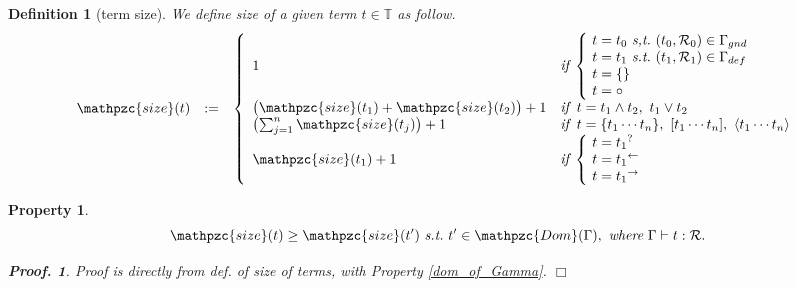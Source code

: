 \documentclass[12pt]{article}
\newtheorem{Definition}{Definition}[section]
\newtheorem{Property}{Property}[section]
\newtheorem{Proof}{Proof.}
\begin{document}
\begin{Definition}[term size]
  We define size of a given term $t \in \mathbb{T}$ as follow.
  \begin{displaymath}
    \begin{array}{lll}
      \mathpzc{size}(t) &:=
      & \left\{ \begin{array}{ll}
          1  & \text{\it if}\;
                \left\{ \! \begin{array}{l}
                  t = t_0\ \text{\it s,t.}\
                   (t_0, \mathcal{R}_0) \in \Gamma_{gnd}  \\
                  t = t_1\ \text{\it s.t.}\
                   (t_1, \mathcal{R}_1) \in \Gamma_{def}  \\
                  t = \{\}  \\
                  t = \circ
                \end{array} \right.  \\
          \bigl(\mathpzc{size}(t_1) + \mathpzc{size}(t_2) \bigr) + 1  &
           \text{\it if}\;\; t = t_1 \wedge t_2,\ t_1 \vee t_2  \\
          \bigl(\sum_{j=1}^{n} \mathpzc{size}(t_j) \bigr) + 1  &
           \text{\it if}\;\; t = \{t_1 \cdots t_n \},
            \ [t_1 \cdots t_n ], \ \langle t_1 \cdots t_n \rangle  \\
          \mathpzc{size}(t_1) + 1  &
           \text{\it if}\; \left\{ \! \begin{array}{l}
             t = {t_1}^?  \\
             t = {t_1}^\leftarrow \\
             t = {t_1}^\rightarrow
           \end{array} \right.
        \end{array} \right.
    \end{array}
  \end{displaymath}
\end{Definition}


\begin{Property}
  \label{termsize_constraint_on_Gamma}
  \[ \mathpzc{size}(t) \ge \mathpzc{size}(t')\ \text{\it s.t.}\
      t' \in \mathpzc{Dom}(\Gamma),\ \text{\it where}\
       \Gamma \vdash t : \mathcal{R}.
  \]
  \begin{Proof}
    Proof is directly from def. of size of terms, with Property
    \ref{dom_of_Gamma}.
    $\Box$
  \end{Proof}
\end{Property}
\end{document}
